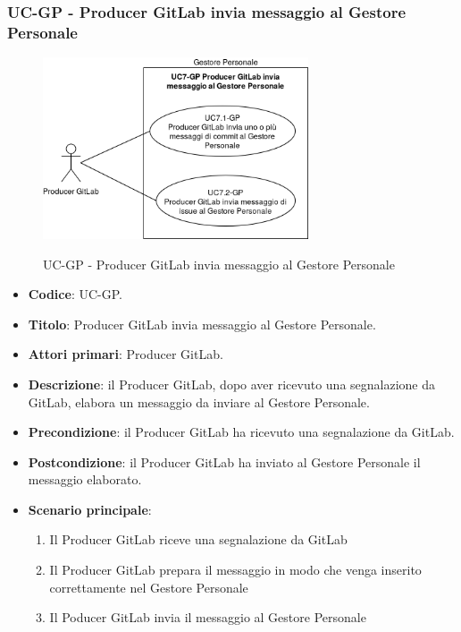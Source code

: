 \subsubsection{UC\theuccount-GP - Producer GitLab invia messaggio al Gestore Personale}
	\begin{figure}[H]
		\centering
		\includegraphics[width=0.7\textwidth]{img/casi_d'uso/UC7.png}\\
		\caption{UC\theuccount-GP - Producer GitLab invia messaggio al Gestore Personale}
	\end{figure}
	\begin{itemize}
		\item \textbf{Codice}: UC\theuccount-GP.
		\item \textbf{Titolo}: Producer GitLab invia messaggio al Gestore Personale.
		\item \textbf{Attori primari}: Producer GitLab.
		\item \textbf{Descrizione}: il Producer GitLab, dopo aver ricevuto una segnalazione da GitLab, elabora un messaggio da inviare al Gestore Personale.
		\item \textbf{Precondizione}: il Producer GitLab ha ricevuto una segnalazione da GitLab.
		\item \textbf{Postcondizione}: il Producer GitLab ha inviato al Gestore Personale il messaggio  \newline elaborato.
		\item \textbf{Scenario principale}: 
		\begin{enumerate}
			\item Il Producer GitLab riceve una segnalazione da GitLab
			\item Il Producer GitLab prepara il messaggio in modo che venga inserito correttamente nel Gestore Personale
			\item Il Poducer GitLab invia il messaggio al Gestore Personale
		\end{enumerate}
		
	\end{itemize}
	\newpage
